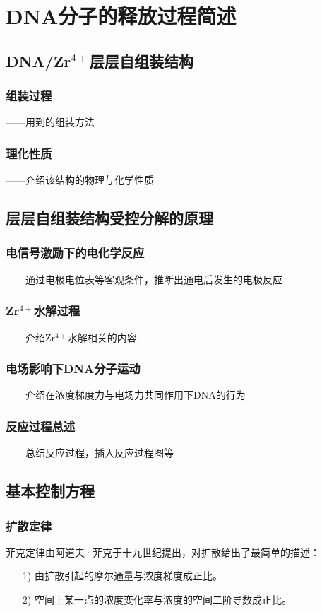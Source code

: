 \chapter{DNA分子的释放过程简述}

\section{DNA/Zr$^{4+}$层层自组装结构}
\subsection{组装过程}
——用到的组装方法
\subsection{理化性质}
——介绍该结构的物理与化学性质

\section{层层自组装结构受控分解的原理}
\subsection{电信号激励下的电化学反应}
——通过电极电位表等客观条件，推断出通电后发生的电极反应
\subsection{Zr$^{4+}$水解过程}
——介绍Zr$^{4+}$水解相关的内容
\subsection{电场影响下DNA分子运动}
——介绍在浓度梯度力与电场力共同作用下DNA的行为
\subsection{反应过程总述}
——总结反应过程，插入反应过程图等

\section{基本控制方程}
\subsection{扩散定律}
菲克定律由阿道夫·菲克于十九世纪提出，对扩散给出了最简单的描述：
\begin{itemize}[leftmargin=60pt]
    \item [1)]由扩散引起的摩尔通量与浓度梯度成正比。
    \item [2)]空间上某一点的浓度变化率与浓度的空间二阶导数成正比。
\end{itemize}

